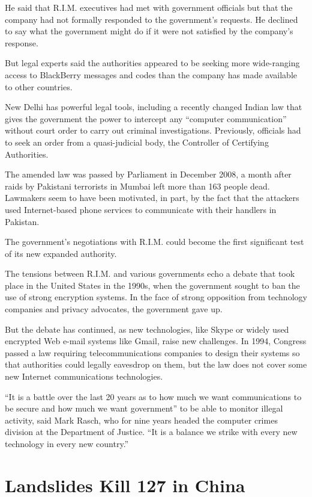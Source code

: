 ﻿\documentclass[12pt]{article}
\begin{document}
He said that R.I.M. executives had met with government officials but that the company had not
formally responded to the government's requests. He declined to say what the government might do if
it were not satisfied by the company's response.

But legal experts said the authorities appeared to be seeking more wide-ranging access to BlackBerry
messages and codes than the company has made available to other countries.

New Delhi has powerful legal tools, including a recently changed Indian law that gives the
government the power to intercept any ``computer communication'' without court order to carry out
criminal investigations. Previously, officials had to seek an order from a quasi-judicial body, the
Controller of Certifying Authorities.

The amended law was passed by Parliament in December 2008, a month after raids by Pakistani
terrorists in Mumbai left more than 163 people dead. Lawmakers seem to have been motivated, in part,
by the fact that the attackers used Internet-based phone services to communicate with their handlers
in Pakistan.

The government's negotiations with R.I.M. could become the first significant test of its new
expanded authority.

The tensions between R.I.M. and various governments echo a debate that took place in the United
States in the 1990s, when the government sought to ban the use of strong encryption systems. In the
face of strong opposition from technology companies and privacy advocates, the government gave up.

But the debate has continued, as new technologies, like Skype or widely used encrypted Web e-mail
systems like Gmail, raise new challenges. In 1994, Congress passed a law requiring
telecommunications companies to design their systems so that authorities could legally eavesdrop on
them, but the law does not cover some new Internet communications technologies.

``It is a battle over the last 20 years as to how much we want communications to be secure and how
much we want government'' to be able to monitor illegal activity, said Mark Rasch, who for nine
years headed the computer crimes division at the Department of Justice. ``It is a balance we strike
with every new technology in every new country.''

\section{Landslides Kill 127 in China}
\end{document}
